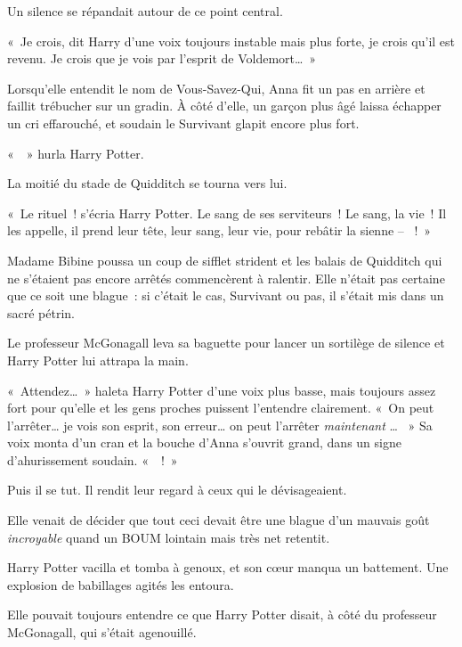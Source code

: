 Un silence se répandait autour de ce point central.

«~Je crois, dit Harry d'une voix toujours instable mais plus forte, je crois qu'il est revenu. Je crois que je vois par l'esprit de Voldemort…~»

Lorsqu'elle entendit le nom de Vous-Savez-Qui, Anna fit un pas en arrière et faillit trébucher sur un gradin. À côté d'elle, un garçon plus âgé laissa échapper un cri effarouché, et soudain le Survivant glapit encore plus fort.

«~~» hurla Harry Potter.

La moitié du stade de Quidditch se tourna vers lui.

«~Le rituel~! s'écria Harry Potter. Le sang de ses serviteurs~! Le sang, la vie~! Il les appelle, il prend leur tête, leur sang, leur vie, pour rebâtir la sienne -- ~!~»

Madame Bibine poussa un coup de sifflet strident et les balais de Quidditch qui ne s'étaient pas encore arrêtés commencèrent à ralentir. Elle n'était pas certaine que ce soit une blague~: si c'était le cas, Survivant ou pas, il s'était mis dans un sacré pétrin.

Le professeur McGonagall leva sa baguette pour lancer un sortilège de silence et Harry Potter lui attrapa la main.

«~Attendez…~» haleta Harry Potter d'une voix plus basse, mais toujours assez fort pour qu'elle et les gens proches puissent l'entendre clairement. «~On peut l'arrêter… je vois son esprit, son erreur… on peut l'arrêter \emph{maintenant} … ~» Sa voix monta d'un cran et la bouche d'Anna s'ouvrit grand, dans un signe d'ahurissement soudain. «~~!~»

Puis il se tut. Il rendit leur regard à ceux qui le dévisageaient.

Elle venait de décider que tout ceci devait être une blague d'un mauvais goût \emph{incroyable} quand un BOUM lointain mais très net retentit.

Harry Potter vacilla et tomba à genoux, et son cœur manqua un battement. Une explosion de babillages agités les entoura.

Elle pouvait toujours entendre ce que Harry Potter disait, à côté du professeur McGonagall, qui s'était agenouillé.

